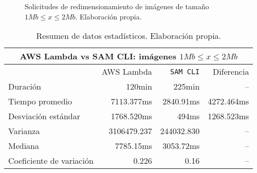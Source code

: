 \begin{figure}[h]
\hspace{-1cm}
\caption[\hspace{0.2cm} Solicitudes de redimensionamiento de imágenes de tamaño $1Mb \leq x \leq 2Mb$]{Solicitudes de redimensionamiento de imágenes de tamaño $1Mb \leq x \leq 2Mb$. Elaboración propia.}
\label{fig:comparacion-sam-2mb}
\end{figure}

\begin{table}[h]
    \centering
    \begin{tabular}{l|r|r|r}
        \toprule[1.5pt]
         \multicolumn{4}{c}{\textbf{AWS Lambda vs SAM CLI: imágenes $1Mb \leq x \leq 2Mb$}} \\
         \midrule
         & AWS Lambda & \texttt{SAM CLI} & Diferencia \\ 
         \midrule
        Duración & 120min & 225min & -- \\
        Tiempo promedio  & 7113.377ms & 2840.91ms & 4272.464ms\\
        Desviación estándar & 1768.520ms & 494ms & 1268.523ms \\
        Varianza & 3106479.237 & 244032.830 & -- \\
        Mediana & 7785.15ms & 3053.72ms & -- \\
        Coeficiente de variación & 0.226 & 0.16 & -- \\                        
        \bottomrule[1.5pt]
    \end{tabular}
    \caption[AWS Lambda vs SAM CLI: imágenes $1Mb \leq x \leq 2Mb$]{Resumen de datos estadísticos. Elaboración propia.}
    \label{table:sam-datos-estadisticos-hasta-2mb}
\end{table}

